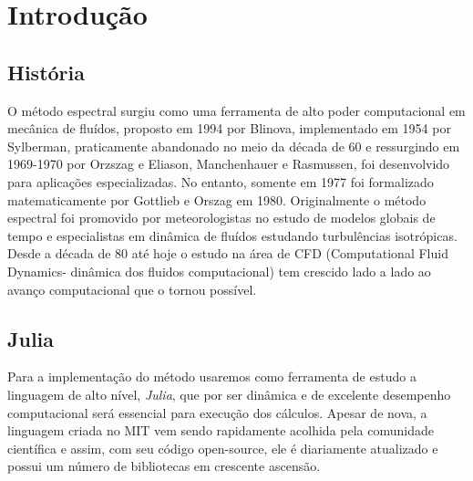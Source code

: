 \chapter{Introdução}
\label{cap:introducao}
\section{História}
O método espectral surgiu como uma ferramenta de alto poder computacional em mecânica de fluídos, proposto em 1994 por Blinova, implementado em 1954 por Sylberman, praticamente abandonado no meio da década de 60 e ressurgindo em 1969-1970 por Orzszag e Eliason, Manchenhauer e Rasmussen, foi desenvolvido para aplicações especializadas. No entanto, somente em 1977 foi formalizado matematicamente por Gottlieb e Orszag em 1980.
Originalmente o método espectral foi promovido por meteorologistas no estudo de modelos globais de tempo e especialistas em dinâmica de fluídos estudando turbulências isotrópicas. Desde a década de 80 até hoje o  estudo na área de CFD (Computational Fluid Dynamics- dinâmica dos fluidos computacional) tem crescido lado a lado ao avanço computacional que o tornou possível.

\section{Julia}
 Para a implementação do método usaremos como ferramenta de estudo a linguagem de alto nível, \emph{Julia}, que por ser dinâmica e de excelente desempenho  computacional será essencial para execução dos cálculos.
 Apesar de nova, a linguagem criada no MIT vem sendo rapidamente acolhida pela comunidade científica e assim, com seu código open-source, ele é diariamente atualizado e possui um número de  bibliotecas em crescente ascensão.


%
%
%




